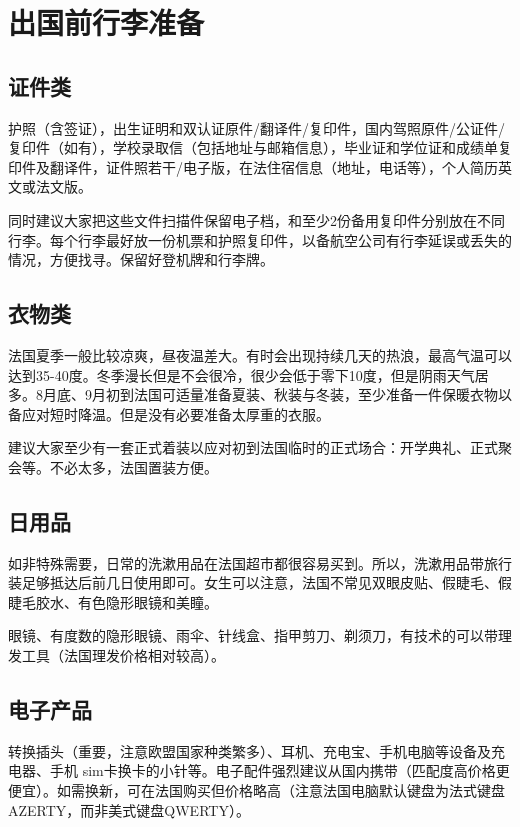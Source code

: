 \section{出国前行李准备}
\subsection{证件类}
护照（含签证），出生证明和双认证原件/翻译件/复印件，国内驾照原件/公证件/复印件（如有），学校录取信（包括地址与邮箱信息），毕业证和学位证和成绩单复印件及翻译件，证件照若干/电子版，在法住宿信息（地址，电话等），个人简历英文或法文版。

同时建议大家把这些文件扫描件保留电子档，和至少2份备用复印件分别放在不同行李。每个行李最好放一份机票和护照复印件，以备航空公司有行李延误或丢失的情况，方便找寻。保留好登机牌和行李牌。

\subsection{衣物类}

法国夏季一般比较凉爽，昼夜温差大。有时会出现持续几天的热浪，最高气温可以达到35-40度。冬季漫长但是不会很冷，很少会低于零下10度，但是阴雨天气居多。8月底、9月初到法国可适量准备夏装、秋装与冬装，至少准备一件保暖衣物以备应对短时降温。但是没有必要准备太厚重的衣服。

建议大家至少有一套正式着装以应对初到法国临时的正式场合：开学典礼、正式聚会等。不必太多，法国置装方便。

\subsection{日用品}

如非特殊需要，日常的洗漱用品在法国超市都很容易买到。所以，洗漱用品带旅行装足够抵达后前几日使用即可。女生可以注意，法国不常见双眼皮贴、假睫毛、假睫毛胶水、有色隐形眼镜和美瞳。

眼镜、有度数的隐形眼镜、雨伞、针线盒、指甲剪刀、剃须刀，有技术的可以带理发工具（法国理发价格相对较高）。

\subsection{电子产品}

转换插头（重要，注意欧盟国家种类繁多）、耳机、充电宝、手机电脑等设备及充电器、手机 sim卡换卡的小针等。电子配件强烈建议从国内携带（匹配度高价格更便宜）。如需换新，可在法国购买但价格略高（注意法国电脑默认键盘为法式键盘AZERTY，而非美式键盘QWERTY）。

